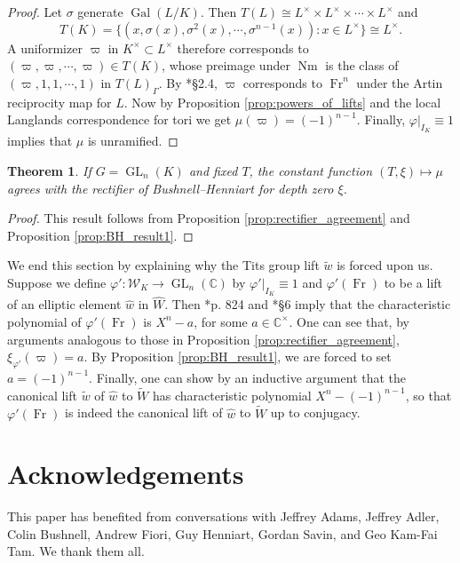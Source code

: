 \documentclass{mrlart7}
\theoremstyle{plain}
\newtheorem{theorem}{Theorem}[section]
\theoremstyle{definition}
\numberwithin{equation}{section}
\DeclareMathOperator{\Gal}{Gal}
\DeclareMathOperator{\Nm}{Nm}
\DeclareMathOperator{\Fr}{Fr}
\DeclareMathOperator{\GL}{GL}
\newcommand{\CC}{\mathbb{C}}
\newcommand{\CCx}{\mathbb{C}^\times}
\newcommand{\Kx}{K^\times}
\newcommand{\Lx}{L^\times}
\newcommand{\Weil}{\mathcal{W}}
\begin{document}
\begin{proof}
Let $\sigma$ generate $\Gal(L/K)$.  Then $T(L) \cong \Lx \times \Lx \times \cdots \times \Lx$ and
$$T(K) = \{(x, \sigma(x), \sigma^2(x), \cdots, \sigma^{n-1}(x)) : x \in \Lx \} \cong \Lx.$$
A uniformizer $\varpi$ in $\Kx \subset \Lx$
therefore corresponds to $(\varpi, \varpi, \cdots, \varpi) \in T(K)$, whose
preimage under $\Nm$ is the class of $(\varpi, 1, 1, \cdots, 1)$ in $T(L)_{\Gamma}$.
By \cite{serre:LocalClassFieldThy}*{\S 2.4}, $\varpi$ corresponds to $\Fr^n$ under the Artin
reciprocity map for $L$.  Now by Proposition \ref{prop:powers_of_lifts}
and the local Langlands correspondence for tori we get
$\mu(\varpi) = (-1)^{n-1}$.
Finally, $\varphi|_{I_K} \equiv 1$ implies that $\mu$ is
unramified.
\end{proof}

\begin{theorem} \label{thm:bh_agreement}
  If $G = \GL_{n}(K)$ and fixed $T$, the constant function $(T,\xi) \mapsto \mu$ agrees with
  the rectifier of Bushnell--Henniart for depth zero $\xi$.
\end{theorem}

\begin{proof}
This result follows from Proposition \ref{prop:rectifier_agreement} and Proposition \ref{prop:BH_result1}.
\end{proof}

We end this section by explaining why the Tits group lift $\tilde{w}$ is forced upon us.
Suppose we define
$\varphi' : \Weil_K \rightarrow \GL_{n}(\CC)$ by $\varphi'|_{I_K} \equiv 1$ and
$\varphi'(\Fr)$ to be a lift of an elliptic element $\hat{w}$ in $\hat{W}$.
Then \cite{reeder-debacker:09a}*{p. 824} and \cite{reeder:08a}*{\S6} imply that the characteristic
polynomial of $\varphi'(\Fr)$ is $X^n - a$, for some $a \in \CCx$.  One can see that,
by arguments analogous to those in Proposition \ref{prop:rectifier_agreement},
$\xi_{\varphi'}(\varpi) = a$.  By Proposition \ref{prop:BH_result1}, we are
forced to set $a = (-1)^{n-1}$.  Finally, one can show by an inductive argument that the
canonical lift $\tilde{w}$ of $\hat{w}$ to $\widetilde{W}$ has characteristic polynomial $X^n - (-1)^{n-1}$,
so that $\varphi'(\Fr)$ is indeed the canonical lift of $\hat{w}$ to $\widetilde{W}$ up to conjugacy.

\section*{Acknowledgements}

This paper has benefited from conversations with Jeffrey Adams, Jeffrey Adler, Colin Bushnell,
Andrew Fiori, Guy Henniart, Gordan Savin, and Geo Kam-Fai Tam.  We thank them all.

%


\end{document}
